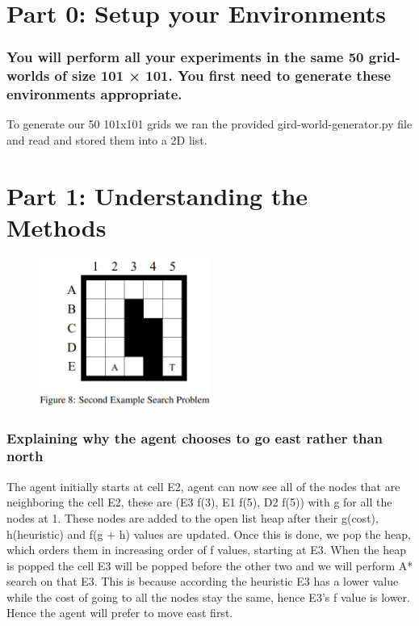 \documentclass{article}
\title{Project #1: Fast Trajectory Replanning} %
\author{Vishnu Dhanasekaran, Swarnendu Roy, Nikhil Kulkarni \\ \texttt{netID: vd247, skr81, nsk62}} %
\date{Rutgers University --- July 13, 2020} %
\begin{document}
\maketitle %



\section*{Part 0: Setup your Environments}
\subsubsection*{You will perform all your experiments in the same 50 grid-worlds of size
101 × 101. You first need to generate these environments appropriate.}
To generate our 50 101x101 grids we ran the provided gird-world-generator.py file and read and stored them into a 2D list. 

\section*{Part 1: Understanding the Methods} %
\setcounter{fig}{0}

\begin{figure}[h!]
  
  \centering
  \includegraphics[width=0.5\textwidth]{east.png}
\end{figure}

\subsubsection*{Explaining why the agent chooses to go east rather than north}
The agent initially starts at cell E2, agent can now see all of the nodes that are neighboring the cell E2, these are (E3 f(3), E1 f(5), D2 f(5)) with g for all the nodes at 1. These nodes are added to the open list heap after their g(cost), h(heuristic) and f(g + h) values are updated. Once this is done, we pop the heap, which orders them in increasing order of f values, starting at E3. When the heap is popped the cell E3 will be popped before the other two and we will perform A* search on that E3. This is because according the heuristic E3 has a lower value while the cost of going to all the nodes stay the same, hence E3's f value is lower. Hence the agent will prefer to move east first.
\end{document}
